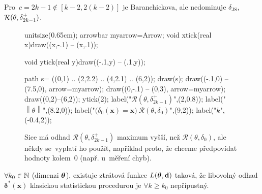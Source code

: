 \begin{remark}
	Pro~$c=2k-1\notin  [k-2,2(k-2)]$ je Baranchickova, ale nedominuje $\delta_\mathrm{JS}$, $\mathcal{R}(\theta,\delta_{2k-1}^+)$.
	\begin{figure}[h]
		\centering
		\begin{asy}
		unitsize(0.65cm);
		arrowbar myarrow=Arrow;
		void xtick(real x){draw((x,-.1) -- (x,.1));}
		
		void ytick(real y){draw((-.1,y) -- (.1,y));}
		
		path s= ((0,1) .. (2,2.2) .. (4,2.1) .. (6,2));
		draw(s);
		draw((-.1,0) -- (7.5,0), arrow=myarrow);
		draw((0,-.1) -- (0,3), arrow=myarrow);
		draw((0,2)--(6,2));
		ytick(2);
		label("$\mathcal{R}(\theta,\delta_{2k-1}^+)$",(2,0.8));
		label("$\left\|\theta\right\|$",(8.2,0));
		label("$\big(\delta_0(\textbf{x})=\textbf{x}\big)~\mathcal{R}(\theta,\delta_0)$",(9,2));
		label("$k$",(-0.4,2));
		\end{asy}
		\caption{Sice má odhad $\mathcal{R}(\theta,\delta_{2k-1}^+)$ maximum vyšší, než $\mathcal{R}(\theta,\delta_0)$, ale někdy se~vyplatí ho použít, například proto, že chceme předpovídat hodnoty kolem~$0$ (např. u~měření chyb).}\label{pic1}
	\end{figure}
\end{remark}
\begin{theorem}
	$\forall k_0\in\mathbb{N}$ (dimenzi $\boldsymbol{\theta}$), existuje ztrátová funkce $L(\boldsymbol{\theta},\textbf{d})$ taková, že libovolný odhad $\boldsymbol{\delta}^\ast(\textbf{x})$ klasickou statistickou procedurou je $\forall k\geq k_0$ nepřípustný.
\end{theorem}

